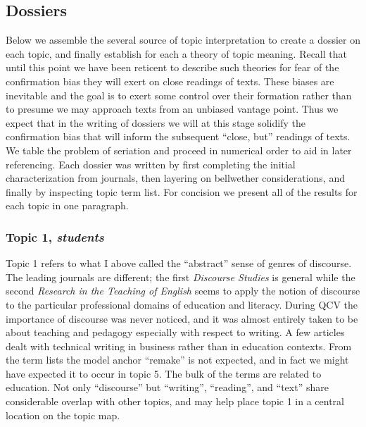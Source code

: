 \documentclass[]{book}
\theoremstyle{definition}
\theoremstyle{definition}
\theoremstyle{definition}
\theoremstyle{remark}
\begin{document}
\hypertarget{dossiers}{%
\subsection{Dossiers}\label{dossiers}}

Below we assemble the several source of topic interpretation to create a
dossier on each topic, and finally establish for each a theory of topic
meaning. Recall that until this point we have been reticent to describe
such theories for fear of the confirmation bias they will exert on close
readings of texts. These biases are inevitable and the goal is to exert
some control over their formation rather than to presume we may approach
texts from an unbiased vantage point. Thus we expect that in the writing
of dossiers we will at this stage solidify the confirmation bias that
will inform the subsequent ``close, but'' readings of texts. We table
the problem of seriation and proceed in numerical order to aid in later
referencing. Each dossier was written by first completing the initial
characterization from journals, then layering on bellwether
considerations, and finally by inspecting topic term list. For concision
we present all of the results for each topic in one paragraph.

\hypertarget{topic-1-students}{%
\subsubsection{\texorpdfstring{Topic 1,
\emph{students}}{Topic 1, students}}\label{topic-1-students}}

Topic 1 refers to what I above called the ``abstract'' sense of genres
of discourse. The leading journals are different; the first
\emph{Discourse Studies} is general while the second \emph{Research in
the Teaching of English} seems to apply the notion of discourse to the
particular professional domains of education and literacy. During QCV
the importance of discourse was never noticed, and it was almost
entirely taken to be about teaching and pedagogy especially with respect
to writing. A few articles dealt with technical writing in business
rather than in education contexts. From the term lists the model anchor
``remake'' is not expected, and in fact we might have expected it to
occur in topic 5. The bulk of the terms are related to education. Not
only ``discourse'' but ``writing'', ``reading'', and ``text'' share
considerable overlap with other topics, and may help place topic 1 in a
central location on the topic map.
\end{document}
